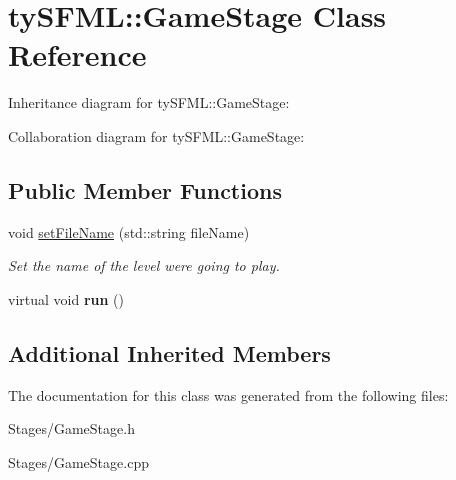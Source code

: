 \hypertarget{classty_s_f_m_l_1_1_game_stage}{}\section{ty\+S\+F\+M\+L\+:\+:Game\+Stage Class Reference}
\label{classty_s_f_m_l_1_1_game_stage}


Inheritance diagram for ty\+S\+F\+M\+L\+:\+:Game\+Stage\+:


Collaboration diagram for ty\+S\+F\+M\+L\+:\+:Game\+Stage\+:
\subsection*{Public Member Functions}
\begin{DoxyCompactItemize}
\item 
\hypertarget{classty_s_f_m_l_1_1_game_stage_ac5f966c6303b6e3ee1efdf1a41d790fa}{}void \hyperlink{classty_s_f_m_l_1_1_game_stage_ac5f966c6303b6e3ee1efdf1a41d790fa}{set\+File\+Name} (std\+::string file\+Name)\label{classty_s_f_m_l_1_1_game_stage_ac5f966c6303b6e3ee1efdf1a41d790fa}

\begin{DoxyCompactList}\small\item\em Set the name of the level we\textquotesingle{}re going to play. \end{DoxyCompactList}\item 
\hypertarget{classty_s_f_m_l_1_1_game_stage_a728d3fa795c71c7aa789a5c263c6c2c9}{}virtual void {\bfseries run} ()\label{classty_s_f_m_l_1_1_game_stage_a728d3fa795c71c7aa789a5c263c6c2c9}

\end{DoxyCompactItemize}
\subsection*{Additional Inherited Members}


The documentation for this class was generated from the following files\+:\begin{DoxyCompactItemize}
\item 
Stages/Game\+Stage.\+h\item 
Stages/Game\+Stage.\+cpp\end{DoxyCompactItemize}
